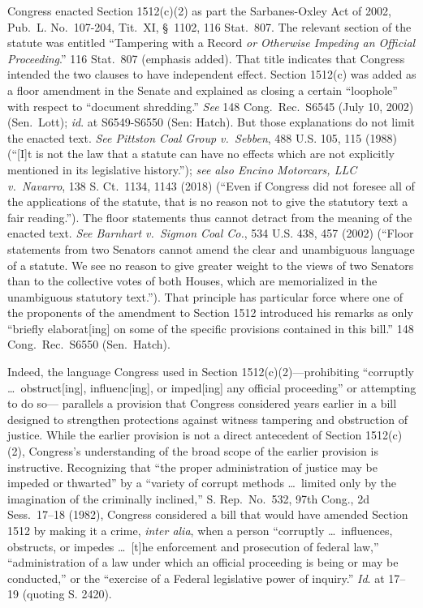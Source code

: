 Congress enacted Section 1512(c)(2) as part the Sarbanes-Oxley Act of 2002, Pub.\ L. No.~107-204, Tit.~XI, \S~1102, 116 Stat.~807.
The relevant section of the statute was entitled ``Tampering with a Record \textit{or Otherwise Impeding an Official Proceeding}.''
116 Stat.~807 (emphasis added).
That title indicates that Congress intended the two clauses to have independent effect.
Section 1512(c) was added as a floor amendment in the Senate and explained as closing a certain ``loophole'' with respect to ``document shredding.''
\textit{See} 148 Cong.\ Rec.\ S6545 (July 10, 2002) (Sen.~Lott);
\textit{id}. at S6549-S6550 (Sen: Hatch).
But those explanations do not limit the enacted text.
\textit{See Pittston Coal Group v.\ Sebben}, 488 U.S. 105, 115 (1988) (``[I]t is not the law that a statute can have no effects which are not explicitly mentioned in its legislative history.'');
\textit{see also Encino Motorcars, LLC v.\ Navarro}, 138 S. Ct.~1134, 1143 (2018) (``Even if Congress did not foresee all of the applications of the statute, that is no reason not to give the statutory text a fair reading.'').
The floor statements thus cannot detract from the meaning of the enacted text.
\textit{See Barnhart v.\ Sigmon Coal Co.}, 534 U.S. 438, 457 (2002) (``Floor statements from two Senators cannot amend the clear and unambiguous language of a statute.
We see no reason to give greater weight to the views of two Senators than to the collective votes of both Houses, which are memorialized in the unambiguous statutory text.'').
That principle has particular force where one of the proponents of the amendment to Section 1512 introduced his remarks as only ``briefly elaborat[ing] on some of the specific provisions contained in this bill.''
148 Cong.\ Rec.\ S6550 (Sen.~Hatch).

Indeed, the language Congress used in Section 1512(c)(2)---prohibiting ``corruptly \dots\ obstruct[ing], influenc[ing], or imped[ing] any official proceeding'' or attempting to do so--- parallels a provision that Congress considered years earlier in a bill designed to strengthen protections against witness tampering and obstruction of justice.
While the earlier provision is not a direct antecedent of Section 1512(c)(2), Congress's understanding of the broad scope of the earlier provision is instructive.
Recognizing that ``the proper administration of justice may be impeded or thwarted'' by a ``variety of corrupt methods \dots\ limited only by the imagination of the criminally inclined,'' S. Rep.\ No.~532, 97th Cong., 2d Sess.~17--18 (1982), Congress considered a bill that would have amended Section 1512 by making it a crime, \textit{inter alia}, when a person ``corruptly \dots\ influences, obstructs, or impedes \dots\ [t]he enforcement and prosecution of federal law,'' ``administration of a law under which an official proceeding is being or may be conducted,'' or the ``exercise of a Federal legislative power of inquiry.'' \textit{Id}. at 17--19 (quoting S. 2420).


